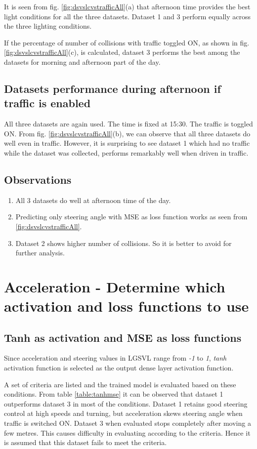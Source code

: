 It is seen from fig. \ref{fig:dsvslcvstrafficAll}(a) that afternoon time provides the best light conditions for all the three
datasets. Dataset 1 and 3 perform equally across the three lighting conditions.

If the percentage of number of collisions with traffic toggled ON, as shown in fig. \ref{fig:dsvslcvstrafficAll}(c), is calculated, dataset 3 performs the best among
the datasets for morning and afternoon part of the day.

\subsection{Datasets performance during afternoon if traffic is enabled}
All three datasets are again used. The time is fixed at 15:30. The traffic is toggled ON.
From fig. \ref{fig:dsvslcvstrafficAll}(b), we can observe that all three datasets do
well even in traffic. However, it is surprising to see dataset 1 which had no traffic
while the dataset was collected, performs remarkably well when driven in traffic.
\subsection{Observations}
\begin{enumerate}
    \item All 3 datasets do well at afternoon time of the day.
    \item Predicting only steering angle with MSE as loss function works as seen from
        \ref{fig:dsvslcvstrafficAll}.
    \item Dataset 2 shows higher number of collisions. So it is better to avoid for
        further analysis.
\end{enumerate}

\section{Acceleration - Determine which activation and loss functions to use}

\subsection{Tanh as activation and MSE as loss functions}
Since acceleration and steering values in LGSVL range from \textit{-1} to \textit{1},
\textit{tanh} activation function is selected as the output dense layer activation
function.

A set of criteria are listed and the trained model is evaluated based on these conditions.
From table \ref{table:tanhmse} it can be observed that dataset 1 outperforms dataset 3 in
most of the conditions. Dataset 1 retains good steering control at high speeds and
turning, but acceleration skews steering angle when traffic is switched ON. Dataset 3 when
evaluated stops completely after moving a few metres. This causes difficulty in evaluating
according to the criteria. Hence it is assumed that this dataset fails to meet the
criteria.

